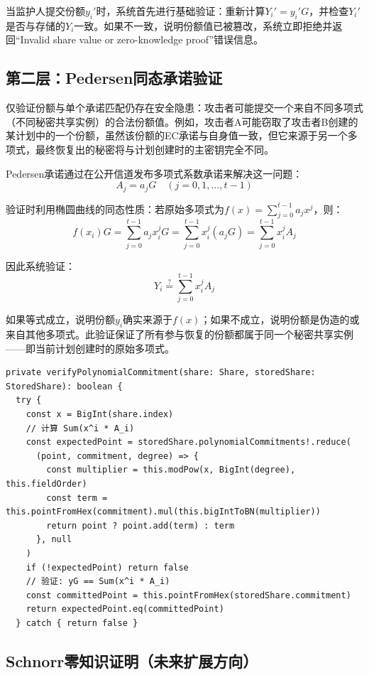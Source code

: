 \documentclass[UTF8,a4paper,zihao=-4,openany]{ctexrep}
\begin{document}
当监护人提交份额$y_i'$时，系统首先进行基础验证：重新计算$Y_i' = y_i'G$，并检查$Y_i'$是否与存储的$Y_i$一致。如果不一致，说明份额值已被篡改，系统立即拒绝并返回“Invalid share value or zero-knowledge proof”错误信息。

\subsection{第二层：Pedersen同态承诺验证}

仅验证份额与单个承诺匹配仍存在安全隐患：攻击者可能提交一个来自不同多项式（不同秘密共享实例）的合法份额值。例如，攻击者A可能窃取了攻击者B创建的某计划中的一个份额，虽然该份额的EC承诺与自身值一致，但它来源于另一个多项式，最终恢复出的秘密将与计划创建时的主密钥完全不同。

Pedersen承诺通过在公开信道发布多项式系数承诺来解决这一问题：
\[
A_j = a_jG \quad (j=0,1,\ldots,t-1)
\]

验证时利用椭圆曲线的同态性质：若原始多项式为$f(x)=\sum_{j=0}^{t-1}a_jx^j$，则：
\[
f(x_i)G = \sum_{j=0}^{t-1} a_j x_i^j G = \sum_{j=0}^{t-1} x_i^j (a_jG) = \sum_{j=0}^{t-1} x_i^j A_j
\]

因此系统验证：
\[
Y_i \stackrel{?}{=} \sum_{j=0}^{t-1} x_i^j A_j
\]

如果等式成立，说明份额$y_i$确实来源于$f(x)$；如果不成立，说明份额是伪造的或来自其他多项式。此验证保证了所有参与恢复的份额都属于同一个秘密共享实例——即当前计划创建时的原始多项式。

\begin{lstlisting}[caption={Pedersen同态承诺验证实现 (shamir.ts:170-188)}]
private verifyPolynomialCommitment(share: Share, storedShare: StoredShare): boolean {
  try {
    const x = BigInt(share.index)
    // 计算 Sum(x^i * A_i)
    const expectedPoint = storedShare.polynomialCommitments!.reduce(
      (point, commitment, degree) => {
        const multiplier = this.modPow(x, BigInt(degree), this.fieldOrder)
        const term = this.pointFromHex(commitment).mul(this.bigIntToBN(multiplier))
        return point ? point.add(term) : term
      }, null
    )
    if (!expectedPoint) return false
    // 验证: yG == Sum(x^i * A_i)
    const committedPoint = this.pointFromHex(storedShare.commitment)
    return expectedPoint.eq(committedPoint)
  } catch { return false }
\end{lstlisting}

\subsection{Schnorr零知识证明（未来扩展方向）}
\end{document}
